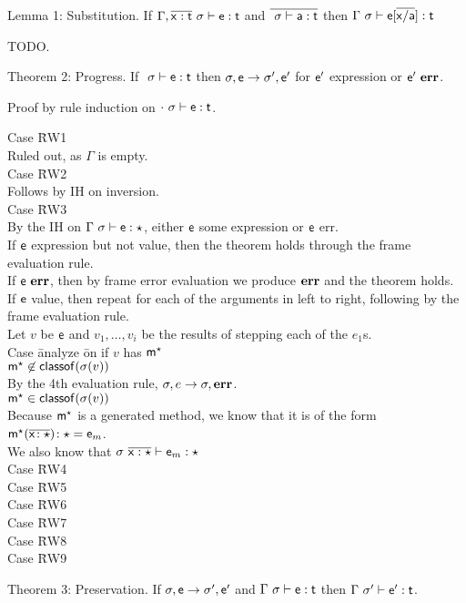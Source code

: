 \documentclass{report}
\newcommand{\m}{\M{\xt{m}}}
\newcommand{\e}{\M{\xt{e}}}
\newcommand{\x}{\M{\xt{x}}}
\renewcommand{\t}{\M{\xt{t}}}
\newcommand{\err}{\M{\bt{err}}}
\newcommand{\s}{\M{\sigma}}
\renewcommand{\a}{\M{\xt a}}
\newcommand{\any}{\M{\star}}
\newcommand{\HT}[2]{\M{{#1}\!:{#2}}}
\newcommand{\Mdef}[5]{\M{ \HT { #1( \b{\HT{#2}{#3}})}{#4}={#5}}}
\newcommand{\M}[1]{\ensuremath{#1}\xspace}
\newcommand{\xt}[1]{{\sf{#1}}\xspace}
\newcommand{\bt}[1]{\xt{\bf #1}}
\renewcommand{\b}[1]{\M{\overline{#1}}}
\newcommand{\classof}[1]{\M{\xt{classof}(#1)}}
\newcommand{\EnvType}[3]{ \M{#1 \vdash #2 : #3}}
\newcommand{\E}{\M{\Gamma}}
\newcommand{\Es}{\E ~\s}
\newcommand{\Dyn}[1]{\M{#1^{\any} }}
\begin{document}
Lemma 1: Substitution. If $\EnvType{\E,\b{\x:\t} ~ \s}{\e}{\t}$ and $\b{\EnvType{~\s}{\a}{\t}}$ then $\EnvType{\Es}{\e[\b{\x/\a}]}{\t}$

TODO.

Theorem 2: Progress. If $\EnvType{~\s}{\e}{\t}$ then $\s,\e \rightarrow \s',\e'$ for $\e'$ expression or $\e' ~ \err$.

Proof by rule induction on $\EnvType{\cdot~\s}{\e}{\t}$.
\begin{tabbing}
Case \=RW1 \\
\> Ruled out, as $\E$ is empty.\\
Case \=RW2 \\
\> Follows by IH on inversion. \\
Case \=RW3 \\
\> By the IH on $\EnvType\Es\e\any$, either $\e$ some expression or $\e$ err. \\
\> If $\e$ expression but not value, then the theorem holds through the frame evaluation rule. \\
\> If $\e~\err$, then by frame error evaluation we produce $\err$ and the theorem holds. \\
\> If $\e$ value, then repeat for each of the arguments in left to right, following by the frame evaluation rule. \\
\> Let $v$ be $\e$ and $v_1,\ldots,v_i$ be the results of stepping each of the $e_1$s.\\
\> Case \=analyze \=on if $v$ has $\Dyn\m$\\
\> \> $\Dyn\m \not\in \classof{\s(v)}$\\
\> \> \> By the 4th evaluation rule, $\s,e \rightarrow \s,\err$.\\
\> \> $\Dyn\m \in \classof{\s(v)}$\\
\> \> \> Because $\Dyn\m$ is a generated method, we know that it is of the form $\Mdef{\Dyn\m}\x\any{\any}\e_m$.\\
\> \> \> We also know that $\EnvType{\s~\b{\x:\any}}{\e_m}\any$\\
Case \=RW4 \\
Case \=RW5 \\
Case \=RW6 \\
Case \=RW7 \\
Case \=RW8 \\
Case \=RW9 \\
\end{tabbing}

Theorem 3: Preservation. If $\s,\e \rightarrow \s',\e'$ and $\EnvType{\Es}{\e}{\t}$ then $\EnvType{\E~\s'}{\e'}{\t}$.
\end{document}
